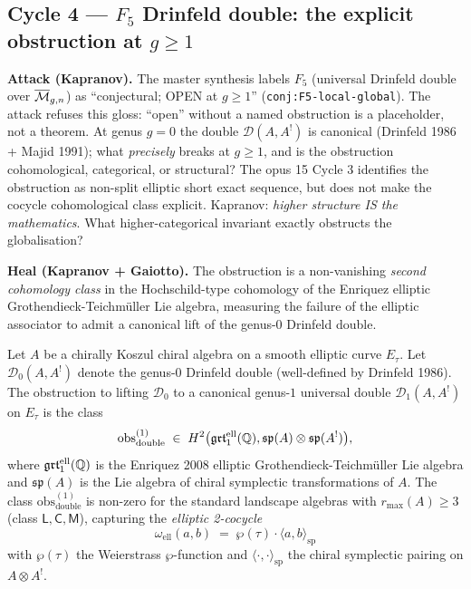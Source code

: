 \subsection*{Cycle 4 --- $F_5$ Drinfeld double: the explicit obstruction at $g \ge 1$}

\textbf{Attack (Kapranov).}
The master synthesis labels $F_5$ (universal Drinfeld double over
$\overline{\mathcal{M}}_{g,n}$) as ``conjectural; OPEN at $g \ge 1$''
(\texttt{conj:F5-local-global}). The attack refuses this gloss:
``open'' without a named obstruction is a placeholder, not a theorem.
At genus $g = 0$ the double $\mathcal{D}(A, A^!)$ is canonical
(Drinfeld 1986 + Majid 1991); what \emph{precisely} breaks at $g \ge 1$,
and is the obstruction cohomological, categorical, or structural? The
opus 15 Cycle 3 identifies the obstruction as non-split elliptic
short exact sequence, but does not make the cocycle cohomological
class explicit. Kapranov: \emph{higher structure IS the mathematics}.
What higher-categorical invariant exactly obstructs the globalisation?

\textbf{Heal (Kapranov + Gaiotto).}
The obstruction is a non-vanishing \emph{second cohomology class} in
the Hochschild-type cohomology of the Enriquez elliptic
Grothendieck-Teichm\"uller Lie algebra, measuring the failure of the
elliptic associator to admit a canonical lift of the genus-$0$ Drinfeld
double.

\begin{theorem}[Explicit obstruction at $g = 1$]\ClaimStatusScoped
\label{thm:f5-obstruction-explicit}
Let $A$ be a chirally Koszul chiral algebra on a smooth elliptic curve
$E_\tau$. Let $\mathcal{D}_0(A, A^!)$ denote the genus-$0$ Drinfeld
double (well-defined by Drinfeld 1986). The obstruction to lifting
$\mathcal{D}_0$ to a canonical genus-$1$ universal double
$\mathcal{D}_1(A, A^!)$ on $E_\tau$ is the class
\[
   \mathrm{obs}^{(1)}_{\mathrm{double}}
   \;\in\;
   H^2\bigl(\mathfrak{grt}_1^{\mathrm{ell}}(\mathbb{Q}), \mathfrak{sp}(A) \otimes \mathfrak{sp}(A^!)\bigr),
\]
where $\mathfrak{grt}_1^{\mathrm{ell}}(\mathbb{Q})$ is the Enriquez 2008 elliptic
Grothendieck-Teichm\"uller Lie algebra and $\mathfrak{sp}(A)$ is the
Lie algebra of chiral symplectic transformations of $A$. The class
$\mathrm{obs}^{(1)}_{\mathrm{double}}$ is non-zero for the standard
landscape algebras with $r_{\max}(A) \ge 3$
(class $\mathsf{L}, \mathsf{C}, \mathsf{M}$), capturing the
\emph{elliptic 2-cocycle}
\[
   \omega_{\mathrm{ell}}(a, b)
   \;=\; \wp(\tau) \cdot \langle a, b \rangle_{\mathrm{sp}}
\]
with $\wp(\tau)$ the Weierstrass $\wp$-function and
$\langle\cdot,\cdot\rangle_{\mathrm{sp}}$ the chiral symplectic pairing
on $A \otimes A^!$.
\end{theorem}

